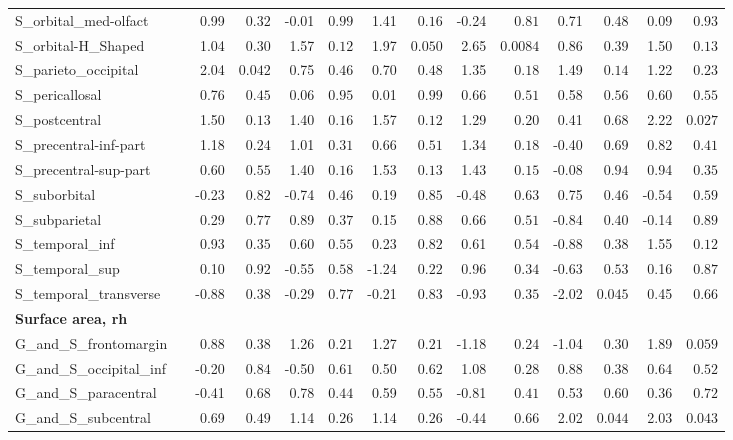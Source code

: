{\begin{longtable}{llrrrrrrrrrrrr}
S\_orbital\_med-olfact &  & 0.99 & $0.32$ & -0.01 & $0.99$ & 1.41 & $0.16$ & -0.24 & $0.81$ & 0.71 & $0.48$ & 0.09 & $0.93$ \\
S\_orbital-H\_Shaped &  & 1.04 & $0.30$ & 1.57 & $0.12$ & 1.97 & $0.050$ & 2.65 & $0.0084$ & 0.86 & $0.39$ & 1.50 & $0.13$ \\
S\_parieto\_occipital &  & 2.04 & $0.042$ & 0.75 & $0.46$ & 0.70 & $0.48$ & 1.35 & $0.18$ & 1.49 & $0.14$ & 1.22 & $0.23$ \\
S\_pericallosal &  & 0.76 & $0.45$ & 0.06 & $0.95$ & 0.01 & $0.99$ & 0.66 & $0.51$ & 0.58 & $0.56$ & 0.60 & $0.55$ \\
S\_postcentral &  & 1.50 & $0.13$ & 1.40 & $0.16$ & 1.57 & $0.12$ & 1.29 & $0.20$ & 0.41 & $0.68$ & 2.22 & $0.027$ \\
S\_precentral-inf-part &  & 1.18 & $0.24$ & 1.01 & $0.31$ & 0.66 & $0.51$ & 1.34 & $0.18$ & -0.40 & $0.69$ & 0.82 & $0.41$ \\
S\_precentral-sup-part &  & 0.60 & $0.55$ & 1.40 & $0.16$ & 1.53 & $0.13$ & 1.43 & $0.15$ & -0.08 & $0.94$ & 0.94 & $0.35$ \\
S\_suborbital &  & -0.23 & $0.82$ & -0.74 & $0.46$ & 0.19 & $0.85$ & -0.48 & $0.63$ & 0.75 & $0.46$ & -0.54 & $0.59$ \\
S\_subparietal &  & 0.29 & $0.77$ & 0.89 & $0.37$ & 0.15 & $0.88$ & 0.66 & $0.51$ & -0.84 & $0.40$ & -0.14 & $0.89$ \\
S\_temporal\_inf &  & 0.93 & $0.35$ & 0.60 & $0.55$ & 0.23 & $0.82$ & 0.61 & $0.54$ & -0.88 & $0.38$ & 1.55 & $0.12$ \\
S\_temporal\_sup &  & 0.10 & $0.92$ & -0.55 & $0.58$ & -1.24 & $0.22$ & 0.96 & $0.34$ & -0.63 & $0.53$ & 0.16 & $0.87$ \\
S\_temporal\_transverse &  & -0.88 & $0.38$ & -0.29 & $0.77$ & -0.21 & $0.83$ & -0.93 & $0.35$ & -2.02 & $0.045$ & 0.45 & $0.66$ \\
\midrule\multicolumn{14}{l}{\textbf{Surface area, rh}} \\
G\_and\_S\_frontomargin &  & 0.88 & $0.38$ & 1.26 & $0.21$ & 1.27 & $0.21$ & -1.18 & $0.24$ & -1.04 & $0.30$ & 1.89 & $0.059$ \\
G\_and\_S\_occipital\_inf &  & -0.20 & $0.84$ & -0.50 & $0.61$ & 0.50 & $0.62$ & 1.08 & $0.28$ & 0.88 & $0.38$ & 0.64 & $0.52$ \\
G\_and\_S\_paracentral &  & -0.41 & $0.68$ & 0.78 & $0.44$ & 0.59 & $0.55$ & -0.81 & $0.41$ & 0.53 & $0.60$ & 0.36 & $0.72$ \\
G\_and\_S\_subcentral &  & 0.69 & $0.49$ & 1.14 & $0.26$ & 1.14 & $0.26$ & -0.44 & $0.66$ & 2.02 & $0.044$ & 2.03 & $0.043$ \\

\end{longtable}}
